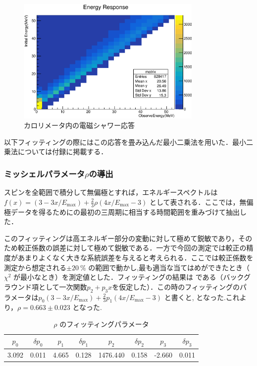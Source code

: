 \begin{figure}[hbt]
\centering
\includegraphics[width=0.8\textwidth]{figure/hatano/response.eps}
\caption{カロリメータ内の電磁シャワー応答}
\label{hatano_fig:response}
\end{figure}

以下フィッティングの際にはこの応答を畳み込んだ最小二乗法を用いた．最小二乗法については付録に掲載する．

\subsubsection{ミッシェルパラメータ$\rho$の導出}
スピンを全範囲で積分して無偏極とすれば，エネルギースペクトルは$f(x)=(3 - 3x / E_\mathrm{max})+\frac{2}{3}\rho(4x / E_\mathrm{max} - 3)$ として表される．ここでは，無偏極データを得るためにの最初の三周期に相当する時間範囲を重みづけて抽出した．

このフィッティングは高エネルギー部分の変動に対して極めて鋭敏であり，そのため較正係数の誤差に対して極めて鋭敏である．一方で今回の測定では較正の精度があまりよくなく大きな系統誤差を与えると考えられる．ここでは較正係数を測定から想定される$\pm 20~\%$ の範囲で動かし,最も適当な当てはめができたとき（$\chi^2$ が最小なとき）を測定値とした．フィッティングの結果は である（バックグラウンド項として一次関数$p_2+p_3x$を仮定した）．この時のフィッティングのパラメータは$p_0(3 - 3x / E_\mathrm{max}) + \frac{2}{3} p_{1} (4x / E_\mathrm{max} - 3)$ と書くと, となった.これより，$\rho=0.663 \pm 0.023$ となった.
\begin{table}[hbt]
\centering
\caption{$\rho$ のフィッティングパラメータ}
\begin{tabular}{cccccccc}
$p_0$ & $\delta p_0$ & $p_1$ & $\delta p_1$ & $p_2$ & $\delta p_2$ & $p_3$ & $\delta p_3$ \\ \hline
3.092 & 0.011 & 4.665 & 0.128 & 1476.440 & 0.158 & -2.660 & 0.011
\end{tabular}
\label{hatano_tab:rho}
\end{table}

